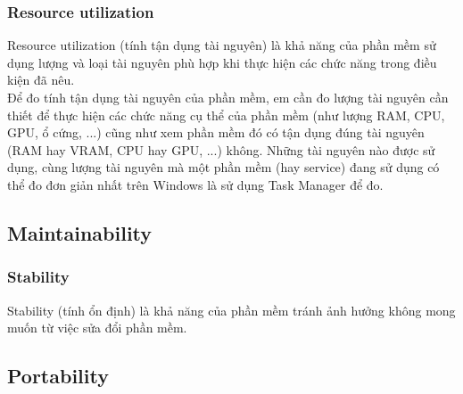 \documentclass[14pt]{extarticle}
\begin{document}
\subsubsection{Resource utilization}
Resource utilization (tính tận dụng tài nguyên) là khả năng của phần mềm
sử dụng lượng và loại tài nguyên phù hợp khi thực hiện các chức năng trong
điều kiện đã nêu.\\
Để đo tính tận dụng tài nguyên của phần mềm, em cần đo lượng tài nguyên
cần thiết để thực hiện các chức năng cụ thể của phần mềm (như lượng RAM,
CPU, GPU, ổ cứng, ...) cũng như xem phần mềm đó có tận dụng đúng tài nguyên
(RAM hay VRAM, CPU hay GPU, ...) không. Những tài nguyên nào được sử dụng,
cùng lượng tài nguyên mà một phần mềm (hay service) đang sử dụng có thể đo
đơn giản nhất trên Windows là sử dụng Task Manager để đo.


\subsection{Maintainability}
\setcounter{subsubsection}{2}
\subsubsection{Stability}
Stability (tính ổn định) là khả năng của phần mềm tránh ảnh hưởng không mong
muốn từ việc sửa đổi phần mềm.\\


\subsection{Portability}
\end{document}
